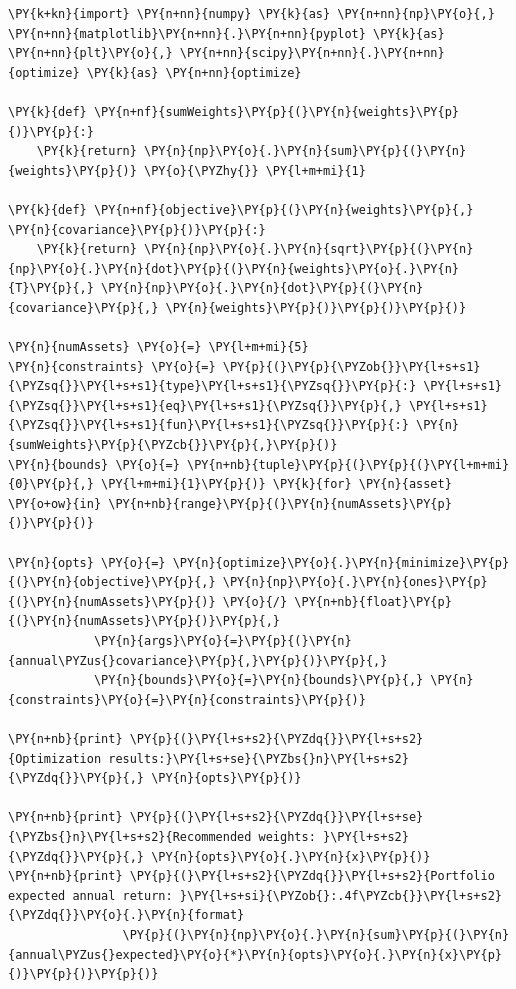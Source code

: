 \begin{tcolorbox}[breakable, size=fbox, boxrule=1pt, pad at break*=1mm,colback=cellbackground, colframe=cellborder]
\begin{Verbatim}[commandchars=\\\{\}]
\PY{k+kn}{import} \PY{n+nn}{numpy} \PY{k}{as} \PY{n+nn}{np}\PY{o}{,} \PY{n+nn}{matplotlib}\PY{n+nn}{.}\PY{n+nn}{pyplot} \PY{k}{as} \PY{n+nn}{plt}\PY{o}{,} \PY{n+nn}{scipy}\PY{n+nn}{.}\PY{n+nn}{optimize} \PY{k}{as} \PY{n+nn}{optimize}

\PY{k}{def} \PY{n+nf}{sumWeights}\PY{p}{(}\PY{n}{weights}\PY{p}{)}\PY{p}{:}
    \PY{k}{return} \PY{n}{np}\PY{o}{.}\PY{n}{sum}\PY{p}{(}\PY{n}{weights}\PY{p}{)} \PY{o}{\PYZhy{}} \PY{l+m+mi}{1}

\PY{k}{def} \PY{n+nf}{objective}\PY{p}{(}\PY{n}{weights}\PY{p}{,} \PY{n}{covariance}\PY{p}{)}\PY{p}{:}
    \PY{k}{return} \PY{n}{np}\PY{o}{.}\PY{n}{sqrt}\PY{p}{(}\PY{n}{np}\PY{o}{.}\PY{n}{dot}\PY{p}{(}\PY{n}{weights}\PY{o}{.}\PY{n}{T}\PY{p}{,} \PY{n}{np}\PY{o}{.}\PY{n}{dot}\PY{p}{(}\PY{n}{covariance}\PY{p}{,} \PY{n}{weights}\PY{p}{)}\PY{p}{)}\PY{p}{)}

\PY{n}{numAssets} \PY{o}{=} \PY{l+m+mi}{5}
\PY{n}{constraints} \PY{o}{=} \PY{p}{(}\PY{p}{\PYZob{}}\PY{l+s+s1}{\PYZsq{}}\PY{l+s+s1}{type}\PY{l+s+s1}{\PYZsq{}}\PY{p}{:} \PY{l+s+s1}{\PYZsq{}}\PY{l+s+s1}{eq}\PY{l+s+s1}{\PYZsq{}}\PY{p}{,} \PY{l+s+s1}{\PYZsq{}}\PY{l+s+s1}{fun}\PY{l+s+s1}{\PYZsq{}}\PY{p}{:} \PY{n}{sumWeights}\PY{p}{\PYZcb{}}\PY{p}{,}\PY{p}{)}
\PY{n}{bounds} \PY{o}{=} \PY{n+nb}{tuple}\PY{p}{(}\PY{p}{(}\PY{l+m+mi}{0}\PY{p}{,} \PY{l+m+mi}{1}\PY{p}{)} \PY{k}{for} \PY{n}{asset} \PY{o+ow}{in} \PY{n+nb}{range}\PY{p}{(}\PY{n}{numAssets}\PY{p}{)}\PY{p}{)}

\PY{n}{opts} \PY{o}{=} \PY{n}{optimize}\PY{o}{.}\PY{n}{minimize}\PY{p}{(}\PY{n}{objective}\PY{p}{,} \PY{n}{np}\PY{o}{.}\PY{n}{ones}\PY{p}{(}\PY{n}{numAssets}\PY{p}{)} \PY{o}{/} \PY{n+nb}{float}\PY{p}{(}\PY{n}{numAssets}\PY{p}{)}\PY{p}{,} 
			\PY{n}{args}\PY{o}{=}\PY{p}{(}\PY{n}{annual\PYZus{}covariance}\PY{p}{,}\PY{p}{)}\PY{p}{,} 
			\PY{n}{bounds}\PY{o}{=}\PY{n}{bounds}\PY{p}{,} \PY{n}{constraints}\PY{o}{=}\PY{n}{constraints}\PY{p}{)}

\PY{n+nb}{print} \PY{p}{(}\PY{l+s+s2}{\PYZdq{}}\PY{l+s+s2}{Optimization results:}\PY{l+s+se}{\PYZbs{}n}\PY{l+s+s2}{\PYZdq{}}\PY{p}{,} \PY{n}{opts}\PY{p}{)}

\PY{n+nb}{print} \PY{p}{(}\PY{l+s+s2}{\PYZdq{}}\PY{l+s+se}{\PYZbs{}n}\PY{l+s+s2}{Recommended weights: }\PY{l+s+s2}{\PYZdq{}}\PY{p}{,} \PY{n}{opts}\PY{o}{.}\PY{n}{x}\PY{p}{)}
\PY{n+nb}{print} \PY{p}{(}\PY{l+s+s2}{\PYZdq{}}\PY{l+s+s2}{Portfolio expected annual return: }\PY{l+s+si}{\PYZob{}:.4f\PYZcb{}}\PY{l+s+s2}{\PYZdq{}}\PY{o}{.}\PY{n}{format}
				\PY{p}{(}\PY{n}{np}\PY{o}{.}\PY{n}{sum}\PY{p}{(}\PY{n}{annual\PYZus{}expected}\PY{o}{*}\PY{n}{opts}\PY{o}{.}\PY{n}{x}\PY{p}{)}\PY{p}{)}\PY{p}{)}


\end{Verbatim}
\end{tcolorbox}
